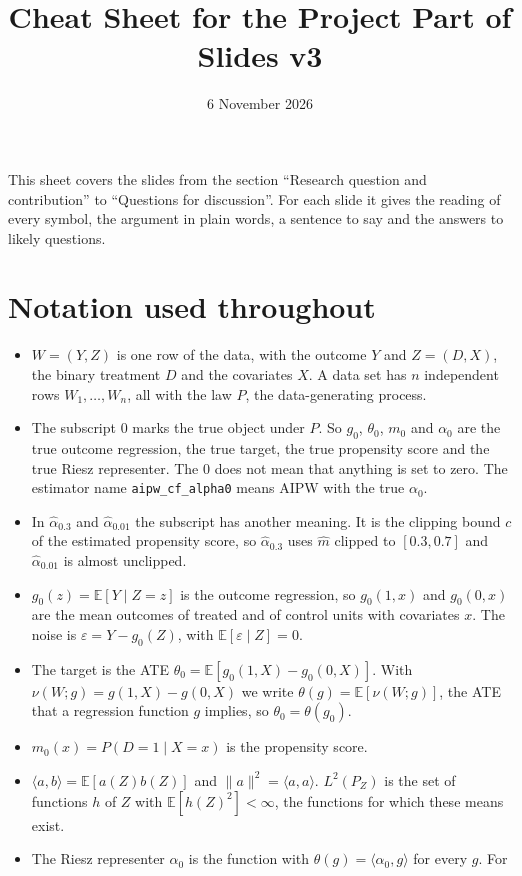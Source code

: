 \documentclass[10pt]{article}
\title{Cheat Sheet for the Project Part of Slides v3}
\author{}
\date{6 November 2026}
\newcommand{\E}{\mathbb{E}}
\begin{document}
\maketitle

This sheet covers the slides from the section ``Research question and contribution'' to ``Questions for discussion''.
For each slide it gives the reading of every symbol, the argument in plain words, a sentence to say and the answers
to likely questions.

\section*{Notation used throughout}

\begin{itemize}
\item $W=(Y,Z)$ is one row of the data, with the outcome $Y$ and $Z=(D,X)$, the binary treatment $D$ and the
covariates $X$. A data set has $n$ independent rows $W_1,\dots,W_n$, all with the law $P$, the data-generating
process.
\item The subscript $0$ marks the true object under $P$. So $g_0$, $\theta_0$, $m_0$ and $\alpha_0$ are the true
outcome regression, the true target, the true propensity score and the true Riesz representer. The $0$ does not mean
that anything is set to zero. The estimator name \texttt{aipw\_cf\_alpha0} means AIPW with the true $\alpha_0$.
\item In $\hat\alpha_{0.3}$ and $\hat\alpha_{0.01}$ the subscript has another meaning. It is the clipping bound $c$
of the estimated propensity score, so $\hat\alpha_{0.3}$ uses $\hat m$ clipped to $[0.3,0.7]$ and $\hat\alpha_{0.01}$
is almost unclipped.
\item $g_0(z)=\E[Y\mid Z=z]$ is the outcome regression, so $g_0(1,x)$ and $g_0(0,x)$ are the mean outcomes of treated
and of control units with covariates $x$. The noise is $\varepsilon=Y-g_0(Z)$, with $\E[\varepsilon\mid Z]=0$.
\item The target is the ATE $\theta_0=\E[g_0(1,X)-g_0(0,X)]$. With $\nu(W;g)=g(1,X)-g(0,X)$ we write
$\theta(g)=\E[\nu(W;g)]$, the ATE that a regression function $g$ implies, so $\theta_0=\theta(g_0)$.
\item $m_0(x)=P(D=1\mid X=x)$ is the propensity score.
\item $\langle a,b\rangle=\E[a(Z)b(Z)]$ and $\|a\|^2=\langle a,a\rangle$. $L^2(P_Z)$ is the set of functions $h$ of
$Z$ with $\E[h(Z)^2]<\infty$, the functions for which these means exist.
\item The Riesz representer $\alpha_0$ is the function with $\theta(g)=\langle\alpha_0,g\rangle$ for every $g$. For

\end{itemize}
\end{document}
